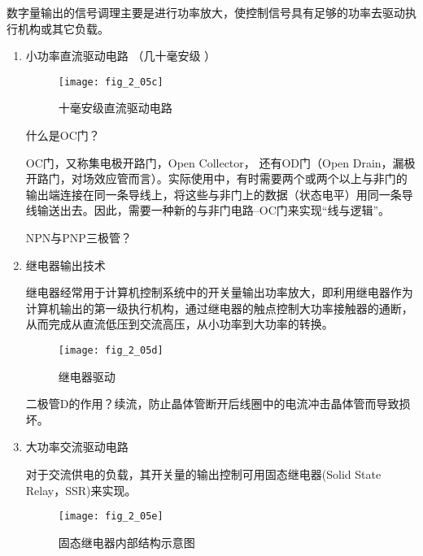 数字量输出的信号调理主要是进行功率放大，使控制信号具有足够的功率去驱动执行机构或其它负载。

\begin{enumerate}
  \item 小功率直流驱动电路 （几十毫安级 ）
\begin{figure}[h]
  \centering
  \texttt{[image: fig\_2\_05c]}
  \caption{十毫安级直流驱动电路}\label{fig_2_05c}
\end{figure}


\begin{remark}
什么是OC门？

OC门，又称集电极开路门，Open Collector，
还有OD门（Open Drain，漏极开路门，对场效应管而言）。实际使用中，有时需要两个或两个以上与非门的输出端连接在同一条导线上，将这些与非门上的数据（状态电平）用同一条导线输送出去。因此，需要一种新的与非门电路--OC门来实现“线与逻辑”。

\end{remark}

\begin{remark}
NPN与PNP三极管？


\end{remark}


  \item 继电器输出技术

      继电器经常用于计算机控制系统中的开关量输出功率放大，即利用继电器作为计算机输出的第一级执行机构，通过继电器的触点控制大功率接触器的通断，从而完成从直流低压到交流高压，从小功率到大功率的转换。

\begin{figure}[h]
  \centering
  \texttt{[image: fig\_2\_05d]}
  \caption{继电器驱动}\label{fig_2_05d}
\end{figure}

\begin{remark}
二极管D的作用？续流，防止晶体管断开后线圈中的电流冲击晶体管而导致损坏。
\end{remark}

  \item 大功率交流驱动电路

      对于交流供电的负载，其开关量的输出控制可用固态继电器(Solid State Relay，SSR)来实现。


\begin{figure}[h]
  \centering
  \texttt{[image: fig\_2\_05e]}
  \caption{固态继电器内部结构示意图}\label{fig_2_05e}
\end{figure}



\end{enumerate}
